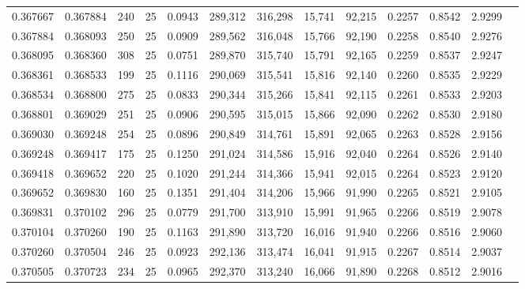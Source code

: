 \begin{tabular}{rrrrrrrrrrrrr}
0.367667 & 0.367884 &   240 &  25 &                                     0.0943 & 289,312 & 316,298 &  15,741 &  92,215 & 0.2257 & 0.8542 & 2.9299 \\
0.367884 & 0.368093 &   250 &  25 &                                     0.0909 & 289,562 & 316,048 &  15,766 &  92,190 & 0.2258 & 0.8540 & 2.9276 \\
0.368095 & 0.368360 &   308 &  25 &                                     0.0751 & 289,870 & 315,740 &  15,791 &  92,165 & 0.2259 & 0.8537 & 2.9247 \\
0.368361 & 0.368533 &   199 &  25 &                                     0.1116 & 290,069 & 315,541 &  15,816 &  92,140 & 0.2260 & 0.8535 & 2.9229 \\
0.368534 & 0.368800 &   275 &  25 &                                     0.0833 & 290,344 & 315,266 &  15,841 &  92,115 & 0.2261 & 0.8533 & 2.9203 \\
0.368801 & 0.369029 &   251 &  25 &                                     0.0906 & 290,595 & 315,015 &  15,866 &  92,090 & 0.2262 & 0.8530 & 2.9180 \\
0.369030 & 0.369248 &   254 &  25 &                                     0.0896 & 290,849 & 314,761 &  15,891 &  92,065 & 0.2263 & 0.8528 & 2.9156 \\
0.369248 & 0.369417 &   175 &  25 &                                     0.1250 & 291,024 & 314,586 &  15,916 &  92,040 & 0.2264 & 0.8526 & 2.9140 \\
0.369418 & 0.369652 &   220 &  25 &                                     0.1020 & 291,244 & 314,366 &  15,941 &  92,015 & 0.2264 & 0.8523 & 2.9120 \\
0.369652 & 0.369830 &   160 &  25 &                                     0.1351 & 291,404 & 314,206 &  15,966 &  91,990 & 0.2265 & 0.8521 & 2.9105 \\
0.369831 & 0.370102 &   296 &  25 &                                     0.0779 & 291,700 & 313,910 &  15,991 &  91,965 & 0.2266 & 0.8519 & 2.9078 \\
0.370104 & 0.370260 &   190 &  25 &                                     0.1163 & 291,890 & 313,720 &  16,016 &  91,940 & 0.2266 & 0.8516 & 2.9060 \\
0.370260 & 0.370504 &   246 &  25 &                                     0.0923 & 292,136 & 313,474 &  16,041 &  91,915 & 0.2267 & 0.8514 & 2.9037 \\
0.370505 & 0.370723 &   234 &  25 &                                     0.0965 & 292,370 & 313,240 &  16,066 &  91,890 & 0.2268 & 0.8512 & 2.9016 \\

\end{tabular}
